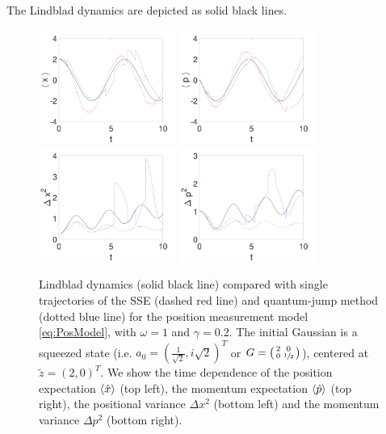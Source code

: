 \documentclass[12pt]{iopart} %
\begin{document}
The Lindblad dynamics are depicted as solid black lines. 
\begin{figure}
  \centering
 	  \includegraphics[width=0.4\textwidth]{XSinglePos.pdf}
	  \includegraphics[width=0.4\textwidth]{PSinglePos.pdf}\\
	  \includegraphics[width=0.4\textwidth]{varXSinglePos.pdf}
	  \includegraphics[width=0.4\textwidth]{varPSinglePos.pdf}
\caption{ Lindblad dynamics (solid black line) compared with single trajectories of the SSE (dashed red line) and quantum-jump method (dotted blue line) for the position measurement model \cref{eq:PosModel}, with $\omega=1$ and $\gamma=0.2$. The initial Gaussian is a squeezed state (i.e. $a_0=(\tfrac{1}{\sqrt{2}}, i\sqrt{2})^T$ or $G=\left(\begin{smallmatrix}2&0\\0&\sfrac{1}{2}\end{smallmatrix}\right)$), centered at $\tilde z=\left(2,0\right)^T$. We show the time dependence of the position expectation $\braket{\hat x}$ (top left), the momentum expectation $\braket{\hat p}$ (top right), the positional variance $\Delta x^2$ (bottom left) and the momentum variance $\Delta p ^2$ (bottom right).}\label{fig:SingleBehaviorPos}
\end{figure}
\end{document}
